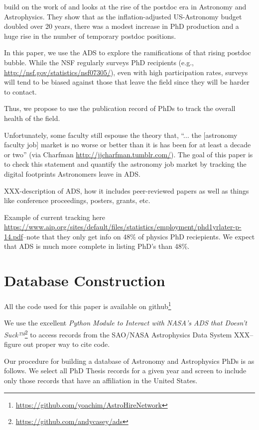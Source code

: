 \documentclass{emulateapj}
\begin{document}
\citet{Seth09} build on the work of \citet{Metcalfe08} and looks at the rise of the postdoc era in Astronomy and Astrophysics.  They show that as the inflation-adjusted US-Astronomy budget doubled over 20 years, there was a modest increase in PhD production and a huge rise in the number of temporary postdoc positions.

In this paper, we use the ADS to explore the ramifications of that rising postdoc bubble.  While the NSF regularly surveys PhD recipients (e.g., \url{http://nsf.gov/statistics/nsf07305/}), even with high participation rates, surveys will tend to be biased against those that leave the field since they will be harder to contact.

Thus, we propose to use the publication record of PhDs to track the overall health of the field.  

Unfortunately, some faculty still espouse the theory that, ``... the [astronomy faculty job] market is no worse or better than it is has been for at least a decade or two'' (via Charfman \url{http://jjcharfman.tumblr.com/}).  The goal of this paper is to check this statement and quantify the astronomy job market by tracking the digital footprints Astronomers leave in ADS. 

XXX-description of ADS, how it includes peer-reviewed papers as well as things like conference proceedings, posters, grants, etc.

Example of current tracking here \url{https://www.aip.org/sites/default/files/statistics/employment/phd1yrlater-p-14.pdf}--note that they only get info on 48\% of physics PhD reciepients.  We expect that ADS is much more complete in listing PhD's than 48\%.


\section{Database Construction}\label{sec:db_construct}

All the code used for this paper is available on github\footnote{\url{https://github.com/yoachim/AstroHireNetwork}}

We use the excellent {\emph{Python Module to Interact with NASA's ADS that Doesn't Suck™}}\footnote{\url{https://github.com/andycasey/ads}} to access records from the SAO/NASA Astrophysics Data System XXX--figure out proper way to cite code. 

Our procedure for building a database of Astronomy and Astrophysics PhDs is as follows.  We select all PhD Thesis records for a given year and screen to include only those records that have an affiliation in the United States.
\end{document}
